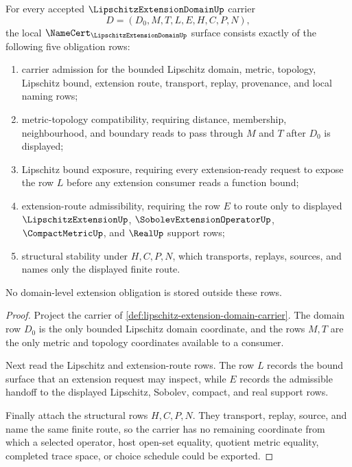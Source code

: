 \begin{theorem}
\label{thm:lipschitz-extension-domain-namecert-obligations}
For every accepted $\LipschitzExtensionDomainUp$ carrier
$$
D=(D_0,M,T,L,E,H,C,P,N),
$$
the local $\NameCert_{\LipschitzExtensionDomainUp}$ surface consists exactly of the following five obligation rows:
\begin{enumerate}
\item carrier admission for the bounded Lipschitz domain, metric, topology, Lipschitz bound, extension route, transport, replay, provenance, and local naming rows;
\item metric-topology compatibility, requiring distance, membership, neighbourhood, and boundary reads to pass through $M$ and $T$ after $D_0$ is displayed;
\item Lipschitz bound exposure, requiring every extension-ready request to expose the row $L$ before any extension consumer reads a function bound;
\item extension-route admissibility, requiring the row $E$ to route only to displayed $\LipschitzExtensionUp$, $\SobolevExtensionOperatorUp$, $\CompactMetricUp$, and $\RealUp$ support rows;
\item structural stability under $H,C,P,N$, which transports, replays, sources, and names only the displayed finite route.
\end{enumerate}
No domain-level extension obligation is stored outside these rows.
\end{theorem}
\begin{proof}
Project the carrier of \autoref{def:lipschitz-extension-domain-carrier}. The domain row $D_0$ is the only bounded Lipschitz domain coordinate, and the rows $M,T$ are the only metric and topology coordinates available to a consumer.

Next read the Lipschitz and extension-route rows. The row $L$ records the bound surface that an extension request may inspect, while $E$ records the admissible handoff to the displayed Lipschitz, Sobolev, compact, and real support rows.

Finally attach the structural rows $H,C,P,N$. They transport, replay, source, and name the same finite route, so the carrier has no remaining coordinate from which a selected operator, host open-set equality, quotient metric equality, completed trace space, or choice schedule could be exported.
\end{proof}

